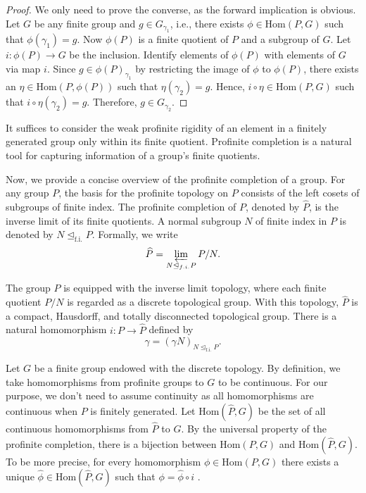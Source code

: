 \documentclass[12pt]{amsart}
\begin{document}
\begin{proof}
    We only need to prove the converse, as the forward implication is obvious. Let $G$ be any finite group and $g \in G_{\gamma_1}$,  i.e., there exists $\phi \in \mathrm{Hom}(P,G)$ such that $\phi(\gamma_1) = g$. Now $\phi(P)$ is a finite quotient of $P$ and a subgroup of $G$. Let $i : \phi(P) \longrightarrow G$ be the inclusion. Identify elements of $\phi(P)$ with elements of $G$ via map $i$. Since $g \in \phi(P)_{\gamma_1}$ by restricting the image of $\phi$ to $\phi(P)$, there exists an $\eta \in \mathrm{Hom}(P,\phi(P))$ such that $\eta(\gamma_2) = g$. Hence, $i \circ \eta \in \mathrm{Hom}(P,G)$ such that $i\circ \eta (\gamma_2) =  g$. Therefore, $g \in G_{\gamma_2}$.  
\end{proof}
It suffices to consider the weak profinite rigidity of an element in a finitely generated group only within its finite quotient. Profinite completion is a natural tool for capturing information of a group's finite quotients.

Now, we provide a concise overview of the profinite completion of a group. For any group $P$, the basis for the profinite topology on $P$ consists of the left cosets of subgroups of finite index. The profinite completion of $P$, denoted by $\widehat{P}$, is the inverse limit of its finite quotients. A normal subgroup $N$ of finite index in $P$ is denoted by $N \unlhd_{\mathrm{f.i.}} P.$ Formally, we write
$$\widehat{P} = \varprojlim_{N \unlhd_{\textrm{f.i.}} P} P/N.$$

The group $\widehat{P}$ is equipped with the inverse limit topology, where each finite quotient $P/N$ is regarded as a discrete topological group. With this topology, $\widehat{P}$ is a compact, Hausdorff, and totally disconnected topological group. There is a natural homomorphism $i : P \longrightarrow \widehat{P}$ defined by  $$\gamma = (\gamma N)_{N \unlhd_{\mathrm{f.i.}} P}.$$ 

Let $G$ be a finite group endowed with the discrete topology. By definition, we take homomorphisms from profinite groups to $G$ to be continuous. For our purpose, we don't need to assume continuity as all homomorphisms are continuous when $P$ is finitely generated. Let ${\mathrm{Hom}}(\widehat{P},G)$ be the set of all continuous homomorphisms from $\widehat{P}$ to $G.$ By the universal property of the profinite completion, there is a bijection between $\mathrm{Hom}(P,G)$ and $\mathrm{Hom}(\widehat{P},G).$  To be more precise, for every homomorphism $\phi \in \mathrm{Hom}(P,G)$ there exists a unique  $\widehat{\phi} \in \mathrm{Hom}(\widehat{P},G)$ such that $\phi = \widehat{\phi} \circ i$ \cite[Lemma 3.2.1]{ribes2000profinite}.
\end{document}
